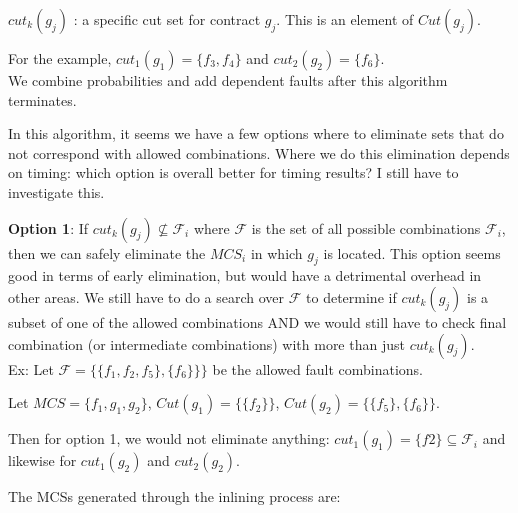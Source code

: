 $cut_k(g_j)$ : a specific cut set for contract $g_j$. This is an element of $Cut(g_j)$. 

For the example, $cut_1(g_1) = \{f_3,f_4\}$ and $cut_2(g_2) = \{f_6\}$.\\


We combine probabilities and add dependent faults after this algorithm terminates. %


In this algorithm, it seems we have a few options where to eliminate sets that do not correspond with allowed combinations. Where we do this elimination depends on timing: which option is overall better for timing results? I still have to investigate this. 

\textbf{Option 1}: If $cut_k(g_j) \not \subseteq \mathcal{F}_i$ where $\mathcal{F}$ is the set of all possible combinations $\mathcal{F}_i $, then we can safely eliminate the $MCS_i$ in which $g_j$ is located. This option seems good in terms of early elimination, but would have a detrimental overhead in other areas. We still have to do a search over $\mathcal{F}$  to determine if $cut_k(g_j)$ is a subset of one of the allowed combinations AND we would still have to check final combination (or intermediate combinations) with more than just $cut_k(g_j)$. \\

Ex: Let $\mathcal{F} = \{\{f_1,f_2,f_5\},\{f_6\}\}\}$ be the allowed fault combinations. 

Let $MCS = \{f_1,g_1,g_2\}$,  $Cut(g_1) = \{\{f_2\}\}$, $Cut(g_2) = \{\{f_5\},\{f_6\}\}$.

Then for option 1, we would not eliminate anything: $cut_1(g_1) = \{f2\} \subseteq \mathcal{F}_i$ and likewise for $cut_1(g_2)$ and $cut_2(g_2)$. 

The MCSs generated through the inlining process are: 

